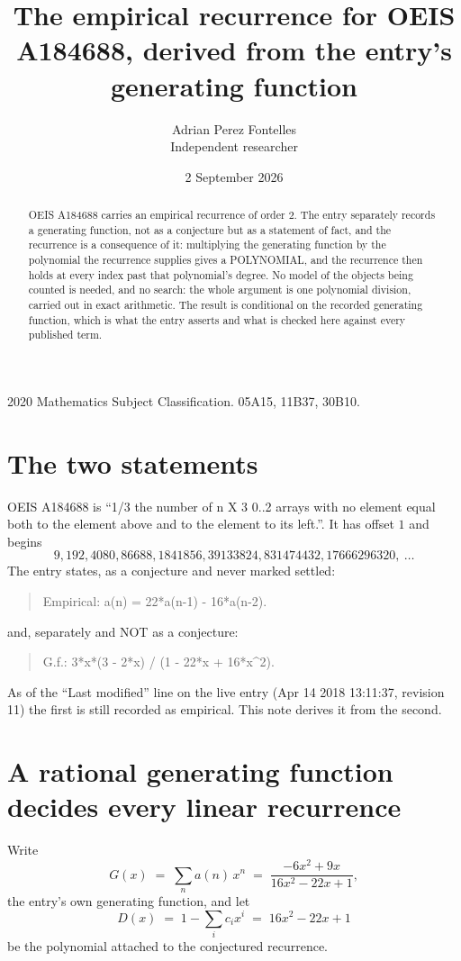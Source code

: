 \documentclass[11pt,a4paper]{article}
\title{The empirical recurrence for OEIS A184688, derived from the entry's generating function}
\author{Adrian Perez Fontelles\\ \small Independent researcher}
\date{2 September 2026}
\theoremstyle{plain}
\theoremstyle{definition}
\begin{document}
\maketitle

\begin{abstract}
OEIS A184688 carries an empirical recurrence of order $2$. The entry separately records a
generating function, not as a conjecture but as a statement of fact, and the recurrence is a
consequence of it: multiplying the generating function by the polynomial the recurrence
supplies gives a POLYNOMIAL, and the recurrence then holds at every index past that
polynomial's degree. No model of the objects being counted is needed, and no search: the
whole argument is one polynomial division, carried out in exact arithmetic. The result is
conditional on the recorded generating function, which is what the entry asserts and what is
checked here against every published term.
\end{abstract}

\noindent\small 2020 Mathematics Subject Classification. 05A15, 11B37, 30B10.\normalsize

\section{The two statements}

OEIS A184688 is ``1/3 the number of n X 3 0..2 arrays with no element equal both to the element above and to the element to its left.''. It has offset $1$ and begins
\[
9, 192, 4080, 86688, 1841856, 39133824, 831474432, 17666296320,\ \dots
\]
The entry states, as a conjecture and never marked settled:
\begin{quote}
Empirical: a(n) = 22*a(n-1) - 16*a(n-2).
\end{quote}
and, separately and NOT as a conjecture:
\begin{quote}
G.f.: 3*x*(3 - 2*x) / (1 - 22*x + 16*x\^{}2).
\end{quote}
As of the ``Last modified'' line on the live entry (Apr 14 2018 13:11:37, revision 11) the first is still
recorded as empirical. This note derives it from the second.

\section{A rational generating function decides every linear recurrence}

Write
\[
G(x)\;=\;\sum_{n}a(n)\,x^{n}\;=\;\frac{- 6 x^{2} + 9 x}{16 x^{2} - 22 x + 1},
\]
the entry's own generating function, and let
\[
D(x)\;=\;1-\sum_i c_i x^{i}\;=\;16 x^{2} - 22 x + 1
\]
be the polynomial attached to the conjectured recurrence.
\end{document}
